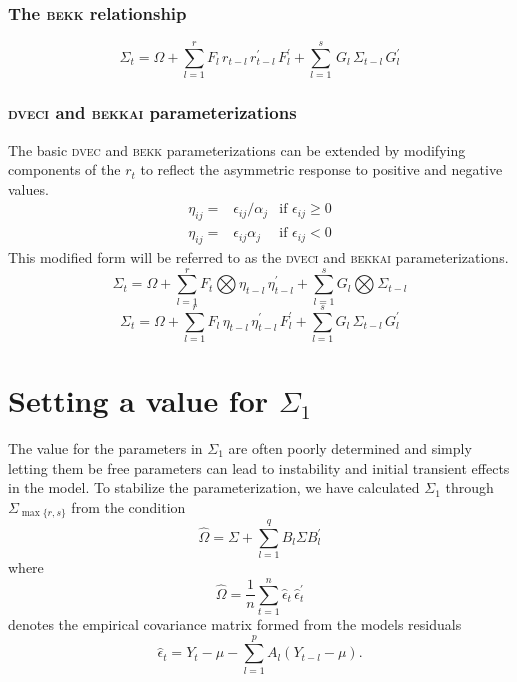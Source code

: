 \subsubsection{The \textsc{bekk} relationship}
\begin{equation}
\Sigma_t=\Omega+
       \sum_{l=1}^r F_l\, r_{t-l}\, r_{t-l}^\prime\, F_l^\prime 
        + \sum_{l=1}^s\, G_l\, \Sigma_{t-l}\, G_l^\prime
  \label{eq2}
\end{equation}

\subsubsection{\textsc{dveci} and \textsc{bekkai} parameterizations}
The basic \textsc{dvec} and \textsc{bekk} parameterizations can be extended by  modifying
components of the $r_t$ to reflect the asymmetric response
to positive and negative values.
\begin{align}
    \nonumber \eta_{ij} =&\epsilon_{ij}/\alpha_j &\textrm{if } \epsilon_{ij} \ge 0\\
    \eta_{ij} =&\epsilon_{ij}\alpha_j                    &\textrm{if }  \epsilon_{ij} < 0
\end{align}
This modified form will be referred to as the \textsc{dveci} and \textsc{bekkai} parameterizations.
\begin{equation}
\Sigma_t=\Omega+
        \sum_{l=1}^r F_t\bigotimes \eta_{t-l}\, \eta_{t-l}^\prime  
         +\sum_{l=1}^sG_l\bigotimes \Sigma_{t-l}
  \label{eqd}
\end{equation}
\begin{equation}
  \Sigma_t=\Omega+
       \sum_{l=1}^r F_l\, \eta_{t-l}\, \eta_{t-l}^\prime\, F_l^\prime 
        + \sum_{l=1}^sG_l\, \Sigma_{t-l}\, G_l^\prime
   \label{eqe}
\end{equation}


\section{Setting a value for $\Sigma_1$}

The value for the parameters in $\Sigma_1$ are often poorly determined 
and simply letting them be free parameters can lead to 
instability and initial
transient effects in the model. To stabilize the parameterization, we have 
calculated $\Sigma_1$ through $\Sigma_{\max\{r,s\}}$ from the condition
\begin{equation}
  \widehat\Omega=\Sigma+\sum_{l=1}^q B_l\Sigma B_l^\prime 
\end{equation}
where 
\begin{equation}
  \widehat\Omega=\frac{1}{n}\sum_{t=1}^n\hat\epsilon_t\, \hat\epsilon_t^\prime 
\end{equation} 
denotes the empirical covariance matrix formed from the
models residuals 
\begin{equation}
  \hat\epsilon_t=Y_t-\mu-\sum_{l=1}^p A_l (Y_{t-l}-\mu).
\end{equation}


